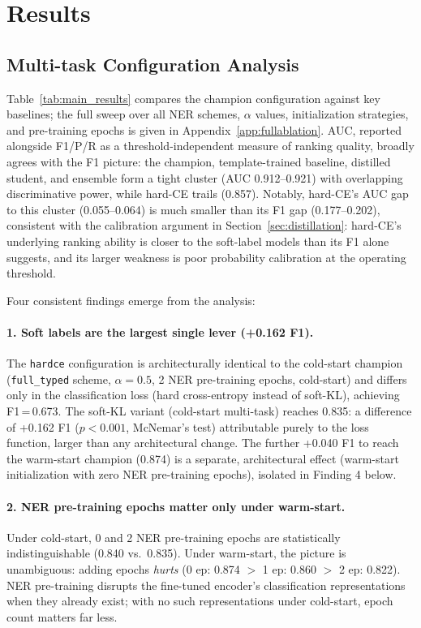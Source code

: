 \documentclass[11pt]{article}
\begin{document}
\section{Results}
\label{sec:results}

\subsection{Multi-task Configuration Analysis}

Table~\ref{tab:main_results} compares the champion configuration against
key baselines; the full sweep over all NER schemes, $\alpha$ values,
initialization strategies, and pre-training epochs is given in
Appendix~\ref{app:fullablation}. AUC, reported alongside F1/P/R as a
threshold-independent measure of ranking quality, broadly agrees with
the F1 picture: the champion, template-trained baseline, distilled
student, and ensemble form a tight cluster (AUC 0.912--0.921) with
overlapping discriminative power, while hard-CE trails (0.857).
Notably, hard-CE's AUC gap to this cluster (0.055--0.064) is much
smaller than its F1 gap (0.177--0.202), consistent with the calibration
argument in Section~\ref{sec:distillation}: hard-CE's underlying ranking
ability is closer to the soft-label models than its F1 alone suggests,
and its larger weakness is poor probability calibration at the
operating threshold.

Four consistent findings emerge from the analysis:

\paragraph{1. Soft labels are the largest single lever (+0.162 F1).}
The \texttt{hardce} configuration is architecturally identical to the
cold-start champion (\texttt{full\_typed} scheme, $\alpha{=}0.5$,
2 NER pre-training epochs, cold-start) and differs only in the
classification loss (hard cross-entropy instead of soft-KL), achieving
F1\,=\,0.673. The soft-KL variant (cold-start multi-task) reaches 0.835:
a difference of +0.162 F1 ($p{<}0.001$, McNemar's test) attributable
purely to the loss function, larger than any architectural change.
The further +0.040 F1 to reach the warm-start champion (0.874) is a
separate, architectural effect (warm-start initialization with zero
NER pre-training epochs), isolated in Finding 4 below.

\paragraph{2. NER pre-training epochs matter only under warm-start.}
Under cold-start, 0 and 2 NER pre-training epochs are statistically
indistinguishable (0.840 vs.\ 0.835). Under warm-start, the picture is
unambiguous: adding epochs \emph{hurts} (0 ep: 0.874 $>$ 1 ep: 0.860 $>$
2 ep: 0.822). NER pre-training disrupts the fine-tuned encoder's
classification representations when they already exist; with no such
representations under cold-start, epoch count matters far less.
\end{document}
